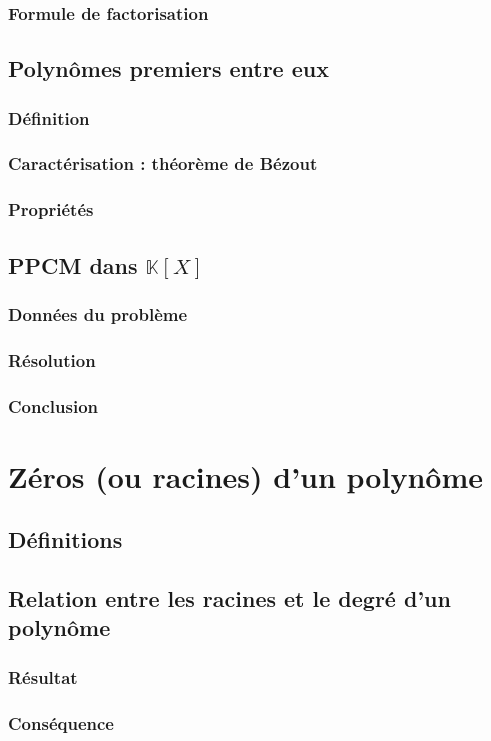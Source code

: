 \documentclass[12pt,a4paper,french]{book}
\begin{document}
			\subsubsection{Formule de factorisation}
		\subsection{Polynômes premiers entre eux}
			\subsubsection{Définition}
			\subsubsection{Caractérisation : théorème de Bézout}
			\subsubsection{Propriétés}
		\subsection{PPCM dans $\mathbb{K}[X]$}
			\subsubsection{Données du problème}
			\subsubsection{Résolution}
			\subsubsection{Conclusion}
	\section{Zéros (ou racines) d'un polynôme}
		\subsection{Définitions}
		\subsection{Relation entre les racines et le degré d'un polynôme}
			\subsubsection{Résultat}
			\subsubsection{Conséquence}
\end{document}
